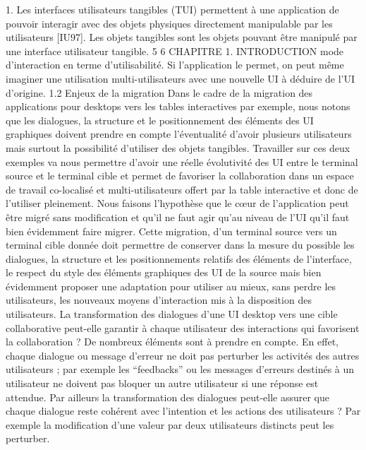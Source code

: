 \documentclass{article}
\begin{document}
1. Les interfaces utilisateurs tangibles (TUI) permettent \`{a} une application de pouvoir interagir avec des objets physiques
directement manipulable par les utilisateurs [IU97]. Les objets tangibles sont les objets pouvant \^{e}tre manipul\'{e} par une
interface utilisateur tangible.
5
6
CHAPITRE 1. INTRODUCTION
mode d’interaction en terme d’utilisabilit\'{e}. Si l’application le permet, on peut m\^{e}me imaginer une
utilisation multi-utilisateurs avec une nouvelle UI \`{a} d\'{e}duire de l’UI d’origine.
1.2
Enjeux de la migration
Dans le cadre de la migration des applications pour desktops vers les tables interactives par
exemple, nous notons que les dialogues, la structure et le positionnement des \'{e}l\'{e}ments des UI graphiques doivent prendre en compte l’\'{e}ventualit\'{e} d’avoir plusieurs utilisateurs mais surtout la possibilit\'{e} d’utiliser des objets tangibles. Travailler sur ces deux exemples va nous permettre d’avoir une
r\'{e}elle \'{e}volutivit\'{e} des UI entre le terminal source et le terminal cible et permet de favoriser la collaboration dans un espace de travail co-localis\'{e} et multi-utilisateurs offert par la table interactive et donc
de l’utiliser pleinement.
Nous faisons l’hypoth\`{e}se que le cœur de l’application peut \^{e}tre migr\'{e} sans modiﬁcation et qu’il ne
faut agir qu’au niveau de l’UI qu’il faut bien \'{e}videmment faire migrer. Cette migration, d’un terminal
source vers un terminal cible donn\'{e}e doit permettre de conserver dans la mesure du possible les
dialogues, la structure et les positionnements relatifs des \'{e}l\'{e}ments de l’interface, le respect du style
des \'{e}l\'{e}ments graphiques des UI de la source mais bien \'{e}videmment proposer une adaptation pour
utiliser au mieux, sans perdre les utilisateurs, les nouveaux moyens d’interaction mis \`{a} la disposition
des utilisateurs.
La transformation des dialogues d’une UI desktop vers une cible collaborative peut-elle garantir
\`{a} chaque utilisateur des interactions qui favorisent la collaboration ? De nombreux \'{e}l\'{e}ments sont \`{a}
prendre en compte. En effet, chaque dialogue ou message d’erreur ne doit pas perturber les activit\'{e}s
des autres utilisateurs ; par exemple les “feedbacks” ou les messages d’erreurs destin\'{e}s \`{a} un utilisateur
ne doivent pas bloquer un autre utilisateur si une r\'{e}ponse est attendue. Par ailleurs la transformation
des dialogues peut-elle assurer que chaque dialogue reste coh\'{e}rent avec l’intention et les actions des
utilisateurs ? Par exemple la modiﬁcation d’une valeur par deux utilisateurs distincts peut les perturber.
\end{document}
